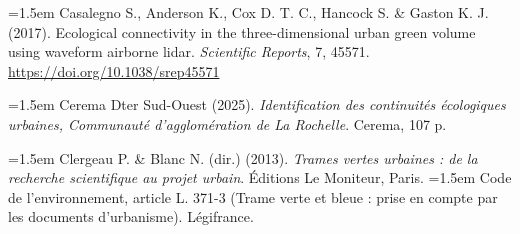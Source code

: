 \documentclass[a4paper,12pt]{report}
\begin{document}
\noindent\hangindent=1.5em Casalegno S., Anderson K., Cox D. T. C., Hancock S. \& Gaston K. J. (2017). Ecological connectivity in the three-dimensional urban green volume using waveform airborne lidar. \textit{Scientific Reports}, 7, 45571. \url{https://doi.org/10.1038/srep45571}\par\medskip
\noindent\hangindent=1.5em Cerema Dter Sud-Ouest (2025). \textit{Identification des continuités écologiques urbaines, Communauté d'agglomération de La Rochelle}. Cerema, 107 p.\par\medskip
\noindent\hangindent=1.5em Clergeau P. \& Blanc N. (dir.) (2013). \textit{Trames vertes urbaines : de la recherche scientifique au projet urbain}. Éditions Le Moniteur, Paris.
\noindent\hangindent=1.5em Code de l'environnement, article L. 371-3 (Trame verte et bleue : prise en compte par les documents d'urbanisme). Légifrance.\par\medskip
\end{document}
